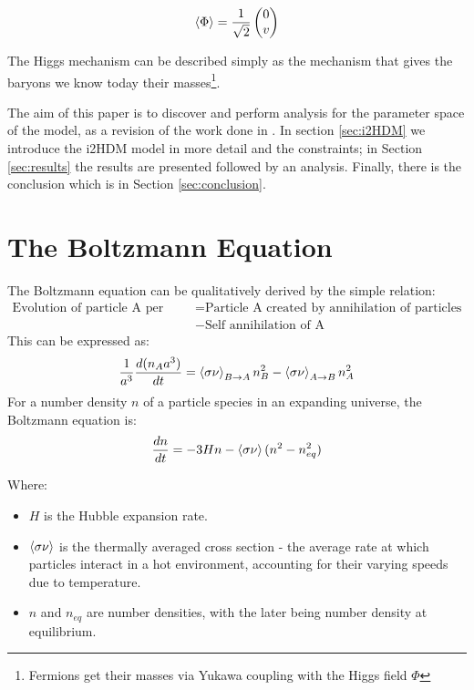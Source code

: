 \documentclass[12pt]{article}
\begin{document}
\begin{equation}
    \braket{\Phi} = \frac{1}{\sqrt{2}}
    \begin{pmatrix}
        0\\
        v
    \end{pmatrix}
\end{equation}

The Higgs mechanism can be described simply as the mechanism that gives the baryons we know today their masses\footnote{Fermions get their masses via Yukawa coupling with the Higgs field $\Phi$}.

The aim of this paper is to discover and perform analysis for the parameter space of the model, as a revision of the work done in \cite{Belyaev:2016lok}. In section \ref{sec:i2HDM} we introduce the i2HDM model in more detail and the constraints; in Section \ref{sec:results} the results are presented followed by an analysis. Finally, there is the conclusion which is in Section \ref{sec:conclusion}.

\section{The Boltzmann Equation}
\label{sec:boltzmann}
The Boltzmann equation can be qualitatively derived by the simple relation:
\begin{equation}
    \begin{split}
            \text{Evolution of particle A per unit volume} &= \text{Particle A created by annihilation of particles in the bath B} 
            \\&- \text{Self annihilation of A}
    \end{split}
\end{equation}
This can be expressed as:
\begin{equation}
    \begin{split}
        \frac{1}{a^3}\frac{d(n_Aa^3)}{dt} = \braket{\sigma \nu}_{B \rightarrow A} n^2_B- \braket{\sigma \nu}_{A \rightarrow B}n^2_A
    \end{split}
\end{equation}
For a number density $n$ of a particle species in an expanding universe, the Boltzmann equation is:
\begin{equation}
    \label{eqn:boltzmann}
    \frac{dn}{dt} = -3Hn - \braket{\sigma\nu}(n^2 - n^2_{eq})
\end{equation}

Where:
\begin{itemize}
    \item $H$ is the Hubble expansion rate.
    \item $\braket{\sigma\nu}$ is the thermally averaged cross section - the average rate at which particles interact in a hot environment, accounting for their varying speeds due to temperature.
    \item $n$ and $n_{eq}$ are number densities, with the later being number density at equilibrium.
\end{itemize}
\end{document}
